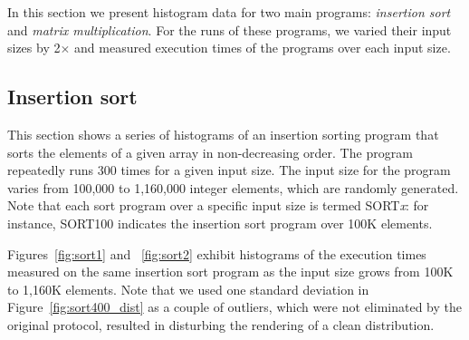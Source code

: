 \documentclass[10pt]{article}
\begin{document}
In this section we present histogram data 
for two main programs: {\it insertion sort} and {\it matrix multiplication}. 
For the runs of these programs, we varied their input sizes by 2{\small $\times$} 
and measured execution times of the programs over each input size. 

\subsection{Insertion sort~\label{sec:sort}} 
This section shows a series of histograms of an insertion sorting program that 
sorts the elements of a given array in non-decreasing order. 
The program repeatedly runs 300 times for a given input size. 
The input size for the program 
varies from 100,000 to 1,160,000 integer elements, which are randomly generated. 
Note that each sort program over a specific input size is termed SORT{\it x}: 
for instance, SORT100 indicates the insertion sort program over 100K elements. 

Figures~\ref{fig:sort1} and ~\ref{fig:sort2} exhibit 
histograms of the execution times measured on the same insertion sort program as 
the input size grows from 100K to 1,160K elements.%
Note that we used one standard deviation in Figure~\ref{fig:sort400_dist} as
a couple of outliers, which were not eliminated by the original protocol, 
resulted in disturbing the rendering of a clean distribution. 
\end{document}
